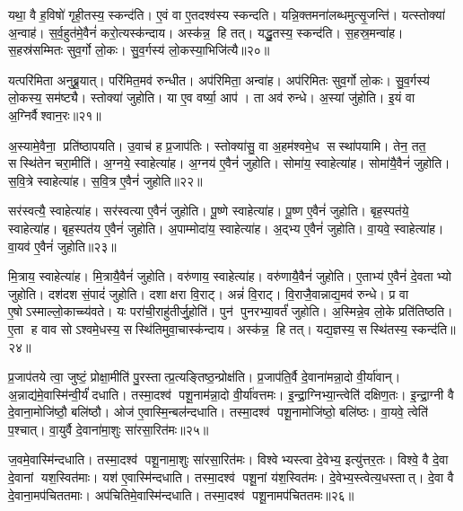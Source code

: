 यथा॒ वै ह॒विषो॑ गृही॒तस्य॒ स्कन्द॑ति।
ए॒वं वा ए॒तदश्व॑स्य स्कन्दति।
यन्नि॒क्तमना॑लब्धमुत्सृ॒जन्ति॑।
यत्स्तोक्या॑ अ॒न्वाह॑।
स॒र्व॒हुत॑मे॒वैनं॑ करो॒त्यस्क॑न्दाय।
अस्क॑न्न॒ हि तत्।
यद्धु॒तस्य॒ स्कन्द॑ति।
स॒हस्र॒मन्वा॑ह।
स॒हस्र॑सम्मितः सुव॒र्गो लो॒कः।
सु॒व॒र्गस्य॑ लो॒कस्या॒भिजि॑त्यै॥२०॥

यत्परि॑मिता अनुब्रू॒यात्।
परि॑मित॒मव॑ रुन्धीत।
अप॑रिमिता॒ अन्वा॑ह।
अप॑रिमितः सुव॒र्गो लो॒कः।
सु॒व॒र्गस्य॑ लो॒कस्य॒ सम॑ष्ट्यै।
स्तोक्या॑ जुहोति।
या ए॒व वर्ष्या॒ आप॑।
ता अव॑ रुन्धे।
अ॒स्यां जु॑होति।
इ॒यं वा अ॒ग्निर्वैश्वान॒रः॥२१॥

अ॒स्यामे॒वैना॒ प्रति॑ष्ठापयति।
उ॒वाच॑ ह प्र॒जाप॑तिः।
स्तोक्या॑सु॒ वा अ॒हम॑श्वमे॒ध सस्था॑पयामि।
तेन॒ तत॒ सस्थि॑तेन चरा॒मीति॑।
अ॒ग्नये॒ स्वाहेत्या॑ह।
अ॒ग्नय॑ ए॒वैनं॑ जुहोति।
सोमा॑य॒ स्वाहेत्या॑ह।
सोमा॑यै॒वैनं॑ जुहोति।
स॒वि॒त्रे स्वाहेत्या॑ह।
स॒वि॒त्र ए॒वैनं॑ जुहोति॥२२॥

सर॑स्वत्यै॒ स्वाहेत्या॑ह।
सर॑स्वत्या ए॒वैनं॑ जुहोति।
पू॒ष्णे स्वाहेत्या॑ह।
पू॒ष्ण ए॒वैनं॑ जुहोति।
बृह॒स्पत॑ये॒ स्वाहेत्या॑ह।
बृह॒स्पत॑य ए॒वैनं॑ जुहोति।
अ॒पाम्मोदा॑य॒ स्वाहेत्या॑ह।
अ॒द्भ्य ए॒वैनं॑ जुहोति।
वा॒यवे॒ स्वाहेत्या॑ह।
वा॒यव॑ ए॒वैनं॑ जुहोति॥२३॥

मि॒त्राय॒ स्वाहेत्या॑ह।
मि॒त्रायै॒वैनं॑ जुहोति।
वरु॑णाय॒ स्वाहेत्या॑ह।
वरु॑णायै॒वैनं॑ जुहोति।
ए॒ताभ्य॑ ए॒वैनं॑ दे॒वताभ्यो जुहोति।
दश॑दश सं॒पादं॑ जुहोति।
दशाक्षरा वि॒राट्।
अन्नं॑ वि॒राट्।
वि॒राजै॒वान्नाद्य॒मव॑ रुन्धे।
प्र वा ए॒षोऽस्माल्लो॒काच्च्य॑वते।
यः परा॑ची॒राहु॑तीर्जु॒होति॑।
पुन॑ पुनरभ्या॒वर्तं॑ जुहोति।
अ॒स्मिन्ने॒व लो॒के प्रति॑तिष्ठति।
ए॒ता ह वाव सोऽश्वमे॒धस्य॒ सस्थि॑तिमुवा॒चास्क॑न्दाय।
अस्क॑न्न॒ हि तत्।
यद्य॒ज्ञस्य॒ सस्थि॑तस्य॒ स्कन्द॑ति॥२४॥\anuvakamend[अ॒भिजि॑त्यै वैश्वान॒रः स॑वि॒त्र ए॒वैनं॑ जुहोति वा॒यव॑ ए॒वैनं॑ जुहोति च्यवते॒ षट् च॑]

प्र॒जाप॑तये त्वा॒ जुष्टं॒ प्रोक्षा॒मीति॑ पु॒रस्तात्प्र॒त्यङ्तिष्ठ॒न्प्रोक्ष॑ति।
प्र॒जाप॑ति॒र्वै दे॒वाना॑मन्ना॒दो वी॒र्या॑वान्।
अ॒न्नाद्य॑मे॒वास्मि॑न्वी॒र्यं॑ दधाति।
तस्मा॒दश्व॑ पशू॒नाम॑न्ना॒दो वी॒र्या॑वत्तमः।
इ॒न्द्रा॒ग्निभ्या॒न्त्वेति॑ दक्षिण॒तः।
इ॒न्द्रा॒ग्नी वै दे॒वाना॒मोजि॑ष्ठौ॒ बलि॑ष्ठौ।
ओज॑ ए॒वास्मि॒न्बल॑न्दधाति।
तस्मा॒दश्व॑ पशू॒नामोजि॑ष्ठो॒ बलि॑ष्ठः।
वा॒यवे॒ त्वेति॑ प॒श्चात्।
वा॒युर्वै दे॒वाना॑मा॒शुः सा॑रसा॒रित॑मः॥२५॥

ज॒वमे॒वास्मि॑न्दधाति।
तस्मा॒दश्व॑ पशू॒नामा॒शुः सा॑रसा॒रित॑मः।
विश्वेभ्यस्त्वा दे॒वेभ्य॒ इत्यु॑त्तर॒तः।
विश्वे॒ वै दे॒वा दे॒वानां यश॒स्वित॑माः।
यश॑ ए॒वास्मि॑न्दधाति।
तस्मा॒दश्व॑ पशू॒नां य॑श॒स्वित॑मः।
दे॒वेभ्य॒स्त्वेत्य॒धस्तात्।
दे॒वा वै दे॒वाना॒मप॑चिततमाः।
अप॑चितिमे॒वास्मि॑न्दधाति।
तस्मा॒दश्व॑ पशू॒नामप॑चिततमः॥२६॥

